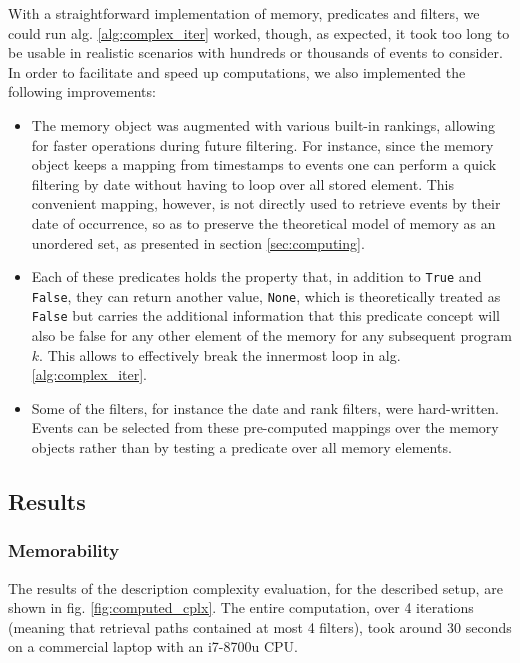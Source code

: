 \documentclass[entropy,article,submit,moreauthors,pdftex]{Definitions/mdpi}
\begin{document}
With a straightforward implementation of memory, predicates and filters, we could run alg. \ref{alg:complex_iter} worked, though, as expected, it took too
long to be usable in realistic scenarios with hundreds or thousands of events to
consider. In order to facilitate and speed up computations, we also implemented
the following improvements:
\begin{itemize}
    \item The memory object was augmented with various built-in rankings, allowing
          for faster operations during future filtering. For instance, since the memory
          object keeps a mapping from timestamps to events one can perform a quick
          filtering by date without having to loop over all stored element. This convenient mapping,
          however, is not directly used to retrieve events by their date of occurrence, so as to
          preserve the theoretical model of memory as an unordered set, as presented in
          section \ref{sec:computing}.

    \item Each of these predicates holds the property that, in addition to
          \texttt{True} and \texttt{False}, they can return another value,
          \texttt{None}, which is theoretically treated as \texttt{False} but carries
          the additional information that this predicate concept will also be false for
          any other element of the memory for any subsequent program $k$. This allows to
          effectively break the innermost loop in alg. \ref{alg:complex_iter}.

    \item Some of the filters, for instance the date and rank filters, were
          hard-written. Events can be selected from these pre-computed mappings over the memory objects
          rather than by testing a predicate over all memory elements.
\end{itemize}


\subsection{Results}
\label{sec:example}
\subsubsection{Memorability}

The results of the description complexity evaluation, for the described setup,
are shown in fig. \ref{fig:computed_cplx}. The entire computation, over 4
iterations (meaning that retrieval paths contained at most 4 filters), took
around 30 seconds on a commercial laptop with an i7-8700u CPU.
\end{document}
